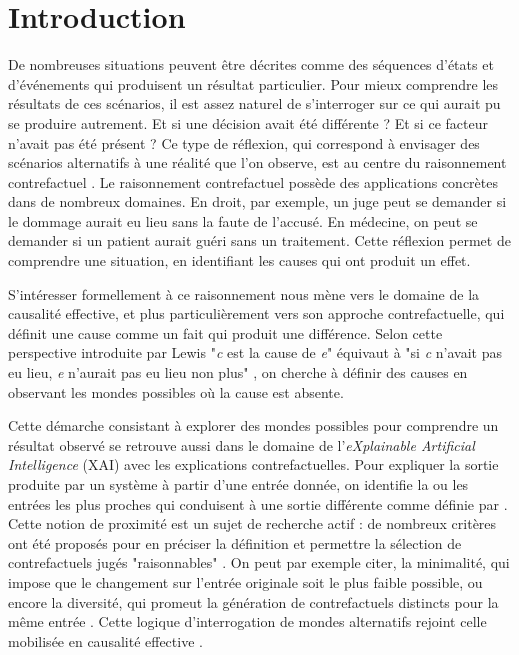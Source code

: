 \section{Introduction}



De nombreuses situations peuvent être décrites comme des séquences d'états et d'événements qui produisent un résultat particulier. Pour mieux comprendre les résultats de ces scénarios, il est assez naturel de s'interroger sur ce qui aurait pu se produire autrement. Et si une décision avait été différente ? Et si ce facteur n'avait pas été présent ? Ce type de réflexion, qui correspond à envisager des scénarios alternatifs à une réalité que l'on observe, est au centre du raisonnement contrefactuel \parencite{sep-causation-counterfactual}. Le raisonnement contrefactuel possède des applications concrètes dans de nombreux domaines. En droit, par exemple, un juge peut se demander si le dommage aurait eu lieu sans la faute de l'accusé. En médecine, on peut se demander si un patient aurait guéri sans un traitement. Cette réflexion permet de comprendre une situation, en identifiant les causes qui ont produit un effet. 


S'intéresser formellement à ce raisonnement nous mène vers le domaine de la causalité effective, et plus particulièrement vers son approche contrefactuelle, qui définit une cause comme un fait qui produit une différence. Selon cette perspective introduite par Lewis "\textit{c} est la cause de \textit{e}" équivaut à "si \textit{c} n'avait pas eu lieu, \textit{e} n'aurait pas eu lieu non plus" \parencite{lewis1973causation}, on cherche à définir des causes en observant les mondes possibles où la cause est absente.


Cette démarche consistant à explorer des mondes possibles pour comprendre un résultat observé se retrouve aussi dans le domaine de l'\textit{eXplainable Artificial Intelligence} (XAI) avec les explications contrefactuelles. Pour expliquer la sortie produite par un système à partir d'une entrée donnée, on identifie la ou les entrées les plus proches qui conduisent à une sortie différente comme définie par \cite{guidotti2024counterfactual}.  Cette notion de proximité est un sujet de recherche actif : de nombreux critères ont été proposés pour en préciser la définition et permettre la sélection de contrefactuels jugés "raisonnables" \parencite{amgoud2026axiomaticfoundationscounterfactualexplanations}. On peut par exemple citer, la minimalité, qui impose que le changement sur l'entrée originale soit le plus faible possible, ou encore la diversité, qui promeut la génération de contrefactuels distincts pour la même entrée \parencite{amgoud2026axiomaticfoundationscounterfactualexplanations}. Cette logique d'interrogation de mondes alternatifs rejoint celle mobilisée en causalité effective \parencite{wachter}.


